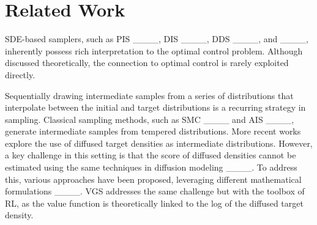 \section{Related Work}
SDE-based samplers, such as PIS ____, DIS ____, DDS ____, and ____, inherently possess rich interpretation to the optimal control problem. Although discussed theoretically, the connection to optimal control is rarely exploited directly. 


Sequentially drawing intermediate samples from a series of distributions that interpolate between the initial and target distributions is a recurring strategy in sampling. Classical sampling methods, such as SMC ____ and AIS ____, generate intermediate samples from tempered distributions.
More recent works explore the use of diffused target densities as intermediate distributions. However, a key challenge in this setting is that the score of diffused densities cannot be estimated using the same techniques in diffusion modeling ____. To address this, various approaches have been proposed, leveraging different mathematical formulations ____. VGS addresses the same challenge but with the toolbox of RL, as the value function is theoretically linked to the log of the diffused target density.